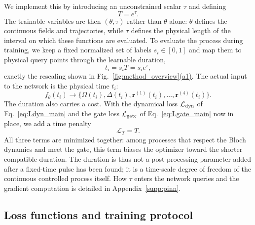 \documentclass[aps,prx,reprint,superscriptaddress,nofootinbib,longbibliography,floatfix,showkeys]{revtex4-2}
\newcommand{\rr}{\bm r}
\newcommand{\Ldyn}{\mathcal L_{\rm dyn}}
\newcommand{\Lgate}{\mathcal L_{\rm gate}}
\newcommand{\LT}{\mathcal L_T}
\newcommand{\appsecref}[1]{Appendix~\hyperref[#1]{\ref*{#1}}}
\newcommand{\panref}[2]{\hyperlink{pan.#1.#2}{(#2)}}
\begin{document}
We implement this by introducing an unconstrained scalar $\tau$ and defining
\begin{equation}
    T=e^\tau .
    \label{eq:T_tau_main}
\end{equation}
The trainable variables are then $(\theta,\tau)$ rather than $\theta$ alone: $\theta$ defines the continuous fields and trajectories, while $\tau$ defines the physical length of the interval on which these functions are evaluated.  To evaluate the process during training, we keep a fixed normalized set of labels $s_i\in[0,1]$ and map them to physical query points through the learnable duration,
\begin{equation}
    t_i=s_iT=s_i e^\tau ,
    \label{eq:ti_siT_main}
\end{equation}
exactly the rescaling shown in Fig.~\ref{fig:method_overview}\panref{fig.method_overview}{a1}.  The actual input to the network is the physical time $t_i$:
\begin{equation}
    f_\theta(t_i)\longrightarrow
    \{\Omega(t_i),\Delta(t_i),\rr^{(1)}(t_i),\ldots,\rr^{(4)}(t_i)\} .
    \label{eq:network_query_time_main}
\end{equation}
The duration also carries a cost.  With the dynamical loss $\Ldyn$ of Eq.~\eqref{eq:Ldyn_main} and the gate loss $\Lgate$ of Eq.~\eqref{eq:Lgate_main} now in place, we add a time penalty
\begin{equation}
    \LT=T .
    \label{eq:LT_main}
\end{equation}
All three terms are minimized together: among processes that respect the Bloch dynamics and meet the gate, this term biases the optimizer toward the shorter compatible duration.  The duration is thus not a post-processing parameter added after a fixed-time pulse has been found; it is a time-scale degree of freedom of the continuous controlled process itself.  How $\tau$ enters the network queries and the gradient computation is detailed in \appsecref{supp:pinn}.

\subsection{Loss functions and training protocol}
\end{document}

